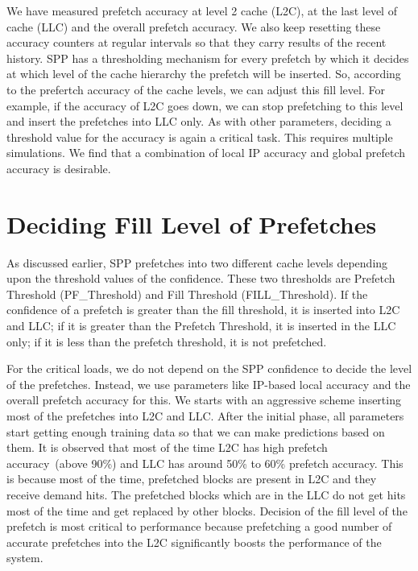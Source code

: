 We have measured prefetch accuracy at level 2 cache (L2C), at the last level of cache (LLC) and the overall prefetch accuracy. We also keep resetting
these accuracy counters at regular intervals so that they carry results of the recent history.
SPP has a thresholding mechanism for every prefetch by which it decides at which level of the cache hierarchy the prefetch will be inserted. So, according to the prefertch accuracy of the cache levels, we can adjust
this fill level. For example, if the accuracy of L2C goes down, we can stop prefetching to this level and
insert the prefetches into LLC only.
As with other parameters, deciding a threshold value for the accuracy is again a critical task. This
requires multiple simulations. We find that a combination of local IP accuracy and global prefetch accuracy is desirable.

\section{Deciding Fill Level of Prefetches}

As discussed earlier, SPP prefetches into two different cache levels depending upon the threshold values of the confidence. These two thresholds are Prefetch Threshold (PF\_Threshold) and Fill
Threshold (FILL\_Threshold). If the confidence of a prefetch is greater than the fill threshold, it is inserted
into L2C and LLC; if it is greater than the Prefetch Threshold, it is inserted in the LLC only;
if it is less than the prefetch threshold, it is not prefetched.

For the critical loads, we do not depend on the SPP confidence to decide the level of the prefetches. Instead,
we use parameters like IP-based local accuracy and the overall prefetch accuracy for this. We starts with an aggressive scheme inserting most of the prefetches into L2C and LLC. After the initial phase, all
parameters start getting enough training data so that we can make predictions based on them.
It is observed that most of the time L2C has high prefetch accuracy~(above 90\%) and
LLC has around 50\% to 60\% prefetch accuracy. This is because most of the time, prefetched blocks are present in L2C and they receive demand hits. The prefetched blocks which are in the LLC do not get hits most of the time and get
replaced by other blocks.
Decision of the fill level of the prefetch is most critical to performance because prefetching a good
number of accurate prefetches into the L2C significantly boosts the performance of the system.

